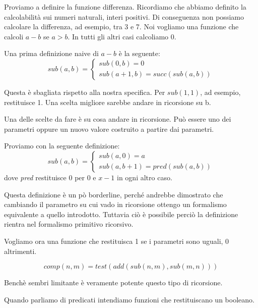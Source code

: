Proviamo a definire la funzione differenza. Ricordiamo che abbiamo definito la calcolabilità sui
numeri naturali, interi positivi. Di conseguenza non possiamo calcolare la differenza, ad esempio,
tra 3 e 7. Noi vogliamo una funzione che calcoli $a - b$ se $a > b$. In tutti gli altri casi
calcoliamo 0.

Una prima definizione naive di $a - b$ è la seguente:
\begin{equation*}
    \textit{sub}(a,b) =
    \begin{cases}
        \textit{sub}(0,b) = 0 \\
        \textit{sub}(a+1,b) = \textit{succ}(\textit{sub}(a,b))
    \end{cases}
\end{equation*}

Questa è sbagliata rispetto alla nostra specifica. Per $sub(1,1)$, ad esempio, restituisce 1. Una
scelta migliore sarebbe andare in ricorsione su b.

Una delle scelte da fare è su cosa andare in ricorsione. Può essere uno dei parametri oppure un
nuovo valore costruito a partire dai parametri.

Proviamo con la seguente definizione:
\begin{equation*}
    \textit{sub}(a,b) =
    \begin{cases}
        \textit{sub}(a,0) = a \\
        \textit{sub}(a,b+1) = \textit{pred}(\textit{sub}(a,b))
    \end{cases}
\end{equation*}
dove \textit{pred} restituisce 0 per 0 e $x-1$ in ogni altro caso.

Questa definizione è un pò borderline, perché andrebbe dimostrato che cambiando il parametro su
cui vado in ricorsione ottengo un formalismo equivalente a quello introdotto. Tuttavia ciò è
possibile perciò la definizione rientra nel formalismo primitivo ricorsivo.

Vogliamo ora una funzione che restituisca 1 se i parametri sono uguali, 0 altrimenti.

\begin{equation*}
    \textit{comp}(n,m) = test(\textit{add}(\textit{sub}(n,m),\textit{sub}(m,n)))
\end{equation*}

Benchè sembri limitante è veramente potente questo tipo di ricorsione.

Quando parliamo di predicati intendiamo funzioni che restituiscano un booleano.

